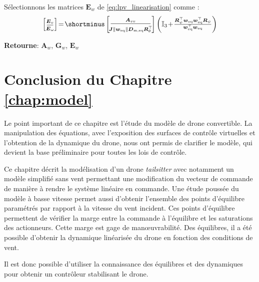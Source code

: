 \begin{algorithm}
\begin{algorithmic} [1]
        \STATE Sélectionnons les matrices $\boldsymbol{E}_w$ de \eqref{eq:lpv_linearisation} comme :
        \begin{align}
        \label{eq:Ev_alg2}
        \left[  \begin{smallmatrix}
        \! \boldsymbol{E}_{v} \rule[-0.1cm]{0cm}{0.35cm} \! \\ \hline \! \boldsymbol{E}_{\omega} \rule{0cm}{0.25cm} \!
            \end{smallmatrix} \right] \!=\! \shortminus
            \left[ \begin{smallmatrix}
            \boldsymbol{A}_{vv} \rule[-0.1cm]{0cm}{0.35cm}
            \\ \hline 
            \rule{0cm}{0.35cm}
            \!\! \boldsymbol{J} \| \boldsymbol{w}_{\mathrm{eq}} \| \boldsymbol{D}_{\text{m,eq}} \boldsymbol{R}_\theta^\top \!\! 
            \end{smallmatrix} \right]
                \left( \mathbb{I}_3 \!+\! \tfrac{
                \boldsymbol{R}_\psi^\top \boldsymbol{w}_\text{eq} \boldsymbol{w}_\text{eq}^\top \boldsymbol{R}_\psi}{\boldsymbol{w}_\text{eq}^\top \boldsymbol{w}_\text{eq}} \right)
        \end{align}

    \end{algorithmic} 
\hspace*{.1cm} \textbf{Retourne}:  $\boldsymbol{A}_{w}$, $\boldsymbol{G}_{w}$, $\boldsymbol{E}_{w}$ 
\end{algorithm}

\newpage
\section{Conclusion du Chapitre \ref{chap:model}}

Le point important de ce chapitre est l'étude du modèle de drone convertible. La manipulation des équations, avec l'exposition des surfaces de contrôle virtuelles et l'obtention de la dynamique du drone, nous ont permis de clarifier le modèle, qui devient la base préliminaire pour toutes les lois de contrôle. 

Ce chapitre décrit la modélisation d'un drone \textit{tailsitter} avec notamment un modèle simplifié sans vent permettant une modification du vecteur de commande de manière à rendre le système linéaire en commande. Une étude poussée du modèle à basse vitesse permet aussi d'obtenir l'ensemble des points d'équilibre paramétrés par rapport à la vitesse du vent incident. Ces points d'équilibre permettent de vérifier la marge entre la commande à l'équilibre et les saturations des actionneurs. Cette marge est gage de manœuvrabilité. Des équilibres, il a été possible d'obtenir la dynamique linéarisée du drone en fonction des conditions de vent.

Il est donc possible d'utiliser la connaissance des équilibres et des dynamiques pour obtenir un contrôleur stabilisant le drone.
